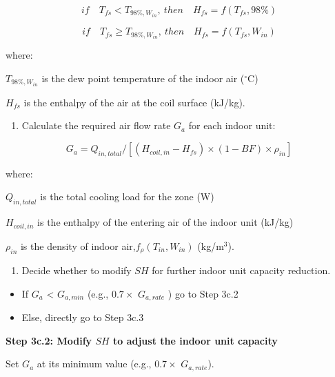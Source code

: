 \begin{equation}
if\quad{T_{fs}}<T_{98\%,W_{in}}{, ~then}\quad{H_{fs}} = f(T_{fs},98\%)
\end{equation}

\begin{equation}
if\quad{T_{fs}}\ge{T_{98\%,W_{in}}}{,~then}\quad{H_{fs}} = f(T_{fs},W_{in})
\end{equation}

where:

\(T_{98\%,W_{in}}\) is the dew point temperature of the indoor air (\(^{\circ}\)C)

\(H_{fs}\) is the enthalpy of the air at the coil surface (kJ/kg).

\begin{enumerate}
\def\labelenumi{\arabic{enumi})}
\setcounter{enumi}{2}
\tightlist
\item
  Calculate the required air flow rate \(G_a\) for each indoor unit:
\end{enumerate}

\begin{equation}
G_a = Q_{in,total}/[(H_{coil,in}-H_{fs})\times{(1-BF)}\times{\rho_{in}}]
\end{equation}

where:

\(Q_{in,total}\) is the total cooling load for the zone (W)

\(H_{coil,in}\) is the enthalpy of the entering air of the indoor unit (kJ/kg)

\(\rho_{in}\) is the density of indoor air,\(f_{\rho}(T_{in},W_{in})\) (kg/m\(^{3}\)).

\begin{enumerate}
\def\labelenumi{\arabic{enumi})}
\setcounter{enumi}{3}
\tightlist
\item
  Decide whether to modify \(SH\) for further indoor unit capacity reduction.
\end{enumerate}

\begin{itemize}
\item
  If \(G_a\) \textless{} \(G_{a,min}\) (e.g., \(0.7\times\) \(G_{a,rate}\) ) go to Step 3c.2
\item
  Else, directly go to Step 3c.3
\end{itemize}

\textbf{Step 3c.2: Modify \(SH\) to adjust the indoor unit capacity}

Set \(G_a\) at its minimum value (e.g., \(0.7\times\) \(G_{a,rate}\)).

